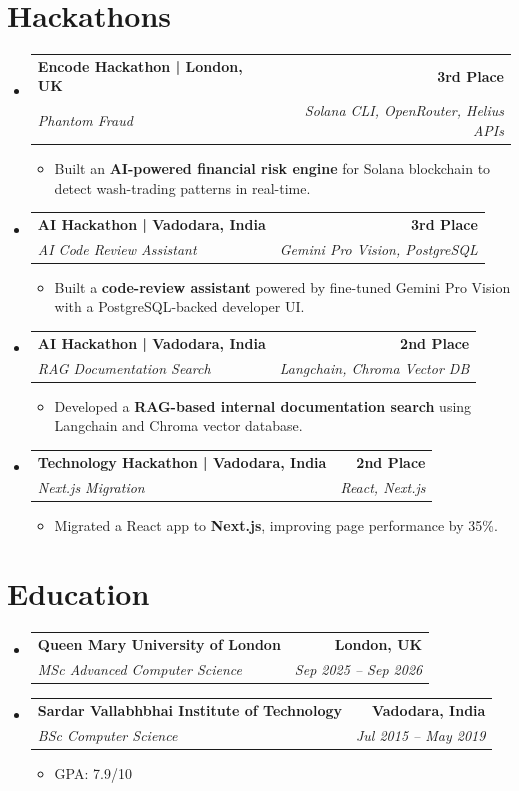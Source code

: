 \documentclass[letterpaper,11pt]{article}
\makeatletter
\newcommand{\resumeItem}[1]{
  \item\small{
    {#1 \vspace{-3pt}}
  }
}
\newcommand{\resumeSubheading}[4]{
  \vspace{-3pt}\item
    \begin{tabular*}{1.0\textwidth}[t]{l@{\extracolsep{\fill}}r}
      \textbf{#1} & \textbf{\small #2} \\
      \textit{\small#3} & \textit{\small #4} \\
    \end{tabular*}\vspace{-7pt}
}
\newcommand{\resumeSubHeadingListStart}{\begin{itemize}[leftmargin=0.0in, label={}]}
\newcommand{\resumeSubHeadingListEnd}{\end{itemize}}
\newcommand{\resumeItemListStart}{\begin{itemize}}
\newcommand{\resumeItemListEnd}{\end{itemize}\vspace{0pt}}
\makeatother
\begin{document}
\section{Hackathons}
\resumeSubHeadingListStart
    \resumeSubheading
      {Encode Hackathon | London, UK}{3rd Place}
      {Phantom Fraud}{Solana CLI, OpenRouter, Helius APIs}
      \resumeItemListStart
        \resumeItem{Built an \textbf{AI-powered financial risk engine} for Solana blockchain to detect wash-trading patterns in real-time.}
      \resumeItemListEnd
    \resumeSubheading
      {AI Hackathon | Vadodara, India}{3rd Place}
      {AI Code Review Assistant}{Gemini Pro Vision, PostgreSQL}
      \resumeItemListStart
        \resumeItem{Built a \textbf{code-review assistant} powered by fine-tuned Gemini Pro Vision with a PostgreSQL-backed developer UI.}
      \resumeItemListEnd
    \resumeSubheading
      {AI Hackathon | Vadodara, India}{2nd Place}
      {RAG Documentation Search}{Langchain, Chroma Vector DB}
      \resumeItemListStart
        \resumeItem{Developed a \textbf{RAG-based internal documentation search} using Langchain and Chroma vector database.}
      \resumeItemListEnd
    \resumeSubheading
      {Technology Hackathon | Vadodara, India}{2nd Place}
      {Next.js Migration}{React, Next.js}
      \resumeItemListStart
        \resumeItem{Migrated a React app to \textbf{Next.js}, improving page performance by 35\%.}
      \resumeItemListEnd
\resumeSubHeadingListEnd

\section{Education}
  \resumeSubHeadingListStart
    \resumeSubheading
      {Queen Mary University of London}{London, UK}
      {MSc Advanced Computer Science}{Sep 2025 -- Sep 2026}
    \resumeSubheading
      {Sardar Vallabhbhai Institute of Technology}{Vadodara, India}
      {BSc Computer Science}{Jul 2015 -- May 2019}
      \resumeItemListStart
        \resumeItem{GPA: 7.9/10}
      \resumeItemListEnd
  \resumeSubHeadingListEnd

\end{document}
